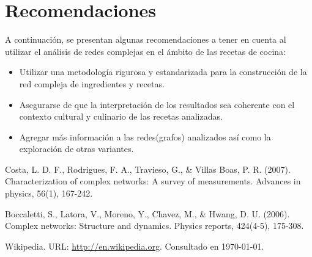 \documentclass[a4paper]{article}
\begin{document}
\section{Recomendaciones}\label{sec:rec}

A continuación, se presentan algunas recomendaciones a tener en cuenta al
utilizar el análisis de redes complejas en el ámbito de las recetas de cocina:
\begin{itemize}
	\item Utilizar una metodología rigurosa y estandarizada para la construcción
	de la red compleja de ingredientes y recetas.
	\item Asegurarse de que la interpretación de los resultados sea coherente
	con el contexto cultural y culinario de las recetas analizadas.
	\item Agregar más información a las redes(grafos) analizados así como la
	exploración de otras variantes.
\end{itemize}




\begin{thebibliography}{99}
	 Costa, L. D. F., Rodrigues, F. A., Travieso, G., \& Villas Boas, P. R. (2007). Characterization of complex networks: A survey of measurements. Advances in physics, 56(1), 167-242.

	 Boccaletti, S., Latora, V., Moreno, Y., Chavez, M., \& Hwang, D. U. (2006). Complex networks: Structure and dynamics. Physics reports, 424(4-5), 175-308.

	 Wikipedia. URL: \href{http://en.wikipedia.org}
	  {http://en.wikipedia.org}.
		Consultado en \today.

\end{thebibliography}


\label{end}
\end{document}
